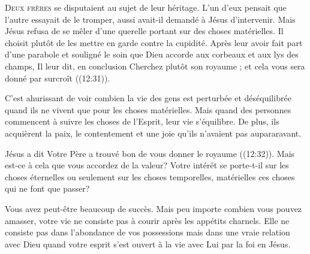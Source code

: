 \dvrule







\lettrine{D}{eux frères} se disputaient au sujet de leur héritage.
 L'un d'eux pensait que l'autre essayait de le tromper,
 aussi avait-il demandé à Jésus d'intervenir.
 Mais Jésus refusa de se mêler d'une querelle portant
 sur des choses matérielles. Il choisit plutôt de les mettre en garde
 contre la cupidité. Après leur avoir fait part d'une parabole
 et souligné le soin que Dieu accorde aux corbeaux et aux lys des champs,
 Il leur dit, en conclusion\frcolon{} 
 \Og Cherchez plutôt son royaume ; et cela vous sera donné par surcroît \Fg{}
 ((12:31)). 


C'est ahurissant de voir combien la vie des gens est perturbée
 et déséquilibrée quand ils ne vivent que pour les choses matérielles.
 Mais quand des personnes commencent à suivre les choses de l'Esprit,
 leur vie s'équilibre. De plus, ils acquièrent la paix,
 le contentement et une joie qu'ils n'avaient pas aupararavant.

Jésus a dit\frcolon{} 
 \Og Votre Père a trouvé bon de vous donner le royaume \Fg{}
 ((12:32)). Mais est-ce à cela que vous accordez
 de la valeur? Votre intérêt se porte-t-il sur les choses éternelles
 ou seulement sur les choses temporelles, matérielles
 \ocadr ces choses qui ne font que passer?

Vous avez peut-être beaucoup de succès. Mais peu importe combien
 vous pouvez amasser, votre vie ne consiste pas à courir après
 les appétits charnels. Elle ne consiste pas dans l'abondance
 de vos possessions mais dans une vraie relation avec Dieu
 quand votre esprit s'est ouvert à la vie avec Lui par la foi en Jésus.

